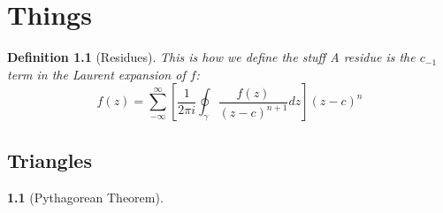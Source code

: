 \documentclass[oneside, 10pt]{memoir}
\theoremstyle{marginlab}
\newtheorem{mdef}{{Definition}}
\numberwithin{mdef}{chapter}
\theoremstyle{marginlab}
\newtheorem{mthm}{\color{accol}{Theorem}}
\numberwithin{mthm}{chapter}
\begin{document}
\chapter{Things}
\begin{mdef}[Residues]
This is how we define the stuff
A residue is the $c_{-1}$ term in the Laurent expansion of $f$:
\begin{equation}
f(z) = \sum_{-\infty}^\infty
	\left[ \frac{1}{2\pi i}
		\oint_\gamma \frac{f(z)}{(z-c)^{n+1}}dz
	\right]
	\left(z-c\right)^n
\end{equation}
\end{mdef}

\lipsum[1-5]
\section{Triangles}
\lipsum[2]
\begin{mthm}[Pythagorean Theorem]
\lipsum[1]
\end{mthm}
\end{document}
